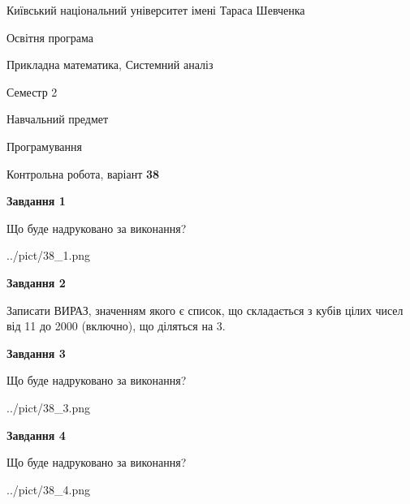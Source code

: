 \documentclass[12pt, ukrainian]{article}
\begin{document}
{{\begin {small}\par
{ \center  Київський національний університет імені Тараса Шевченка \par}
{\parbox {5 cm}{Освітня програма \hfill}{\parbox {8 cm}{Прикладна математика, Системний аналіз \hfill}}\parbox {5 cm}{\hfill Семестр 2}}\par
{\parbox {5 cm} {Навчальний предмет \hfill}\parbox {7 cm}{Програмування \hfill}\parbox {6cm}{\hfill}\par}\vspace{-7pt} \end{small}}{\center Контрольна робота, варіант  \No \textbf
{ 38 }\par}}
{
\begin {large}
{\begin {center}\textbf{Завдання 1}\end {center}}\par
Що буде надруковано за виконання?\par\par
\begin{center}
	{../pict/38_1.png}
\end{center}
\newpage

{\begin {center}\textbf{Завдання 2}\end {center}}\par

Записати ВИРАЗ, значенням якого є список, що складається з кубів цілих чисел від 11 до 2000 (включно), що діляться на 3.\par
\newpage

{\begin {center}\textbf{Завдання 3}\end {center}}\par
Що буде надруковано за виконання?
\begin{center}
	{../pict/38_3.png}
\end{center}
\newpage

{\begin {center}\textbf{Завдання 4}\end {center}}\par
Що буде надруковано за виконання?\par
\begin{center}
	{../pict/38_4.png}
\end{center}
\newpage


\end{large}}
\end{document}
